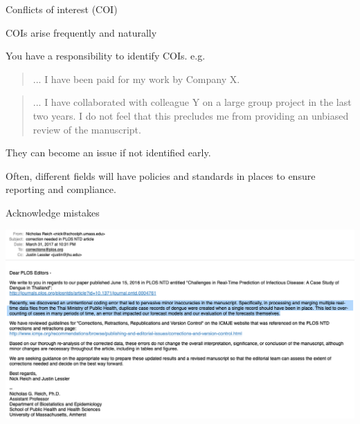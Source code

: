 \documentclass[table]{beamer}\usepackage[]{graphicx}\usepackage[]{color}
\begin{document}
\begin{frame}[fragile]{Conflicts of interest (COI)}

\begin{block}{COIs arise frequently and naturally}

\bi
  \item You have a responsibility to identify COIs. e.g. 
  
  \begin{quotation}
    \noindent \small ... I have been paid for my work by Company X.
  \end{quotation}
  
  \begin{quotation}
    \noindent \small ... I have collaborated with colleague Y on a large group project in the last two years. I do not feel that this precludes me from providing an unbiased review of the manuscript.
  \end{quotation}
  
  \item They can become an issue if not identified early.
  \item Often, different fields will have policies and standards in places to ensure reporting and compliance. 
  
\ei

\end{block}

\end{frame}



\begin{frame}[fragile]{Acknowledge mistakes}

\includegraphics[width=\textwidth]{figure-static/email-to-plos}

\end{frame}
\end{document}
